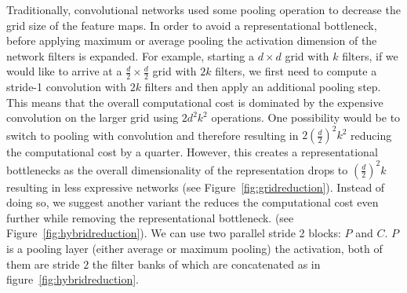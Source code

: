Traditionally, convolutional networks used some pooling operation to decrease
the grid size of the feature maps. In order to avoid a representational
bottleneck, before applying maximum or average pooling the activation
dimension of the network filters is expanded.
For example, starting a $d\times d$ grid
with $k$ filters, if we would like to arrive at a
$\frac{d}{2}\times \frac{d}{2}$ grid with $2k$ filters,
we first need to compute a stride-1 convolution with $2k$
filters and then apply an additional pooling step. This means that the overall
computational cost is dominated by the expensive convolution on the larger grid
using $2d^2k^2$ operations. One possibility would be to switch to pooling with
convolution and therefore resulting in $2(\frac{d}{2})^2k^2$ reducing the
computational cost by a quarter. However, this creates a representational
bottlenecks as the overall dimensionality of the representation drops to
$(\frac{d}{2})^2k$ resulting in less expressive networks (see
Figure~\ref{fig:gridreduction}).
Instead of doing so, we suggest another variant the reduces the computational
cost even further while removing the representational bottleneck.
(see Figure~\ref{fig:hybridreduction}).
We can use two parallel stride 2 blocks: $P$ and $C$. $P$ is a pooling layer
(either average or maximum pooling) the activation, both of them are stride
$2$ the filter banks of which are concatenated as in
figure~\ref{fig:hybridreduction}.
